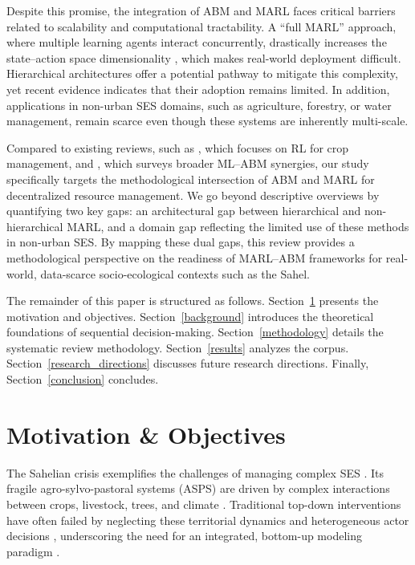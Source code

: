 \documentclass[conference]{IEEEtran}
\begin{document}
Despite this promise, the integration of ABM and MARL faces critical barriers related to scalability and computational tractability. A “full MARL” approach, where multiple learning agents interact concurrently, drastically increases the state–action space dimensionality \cite{zhangMultiAgentReinforcementLearning2021}, which makes real-world deployment difficult. Hierarchical architectures offer a potential pathway to mitigate this complexity, yet recent evidence indicates that their adoption remains limited. In addition, applications in non-urban SES domains, such as agriculture, forestry, or water management, remain scarce even though these systems are inherently multi-scale. 

Compared to existing reviews, such as \cite{gautronReinforcementLearningCrop2022}, which focuses on RL for crop management, and \cite{Zhang20232170}, which surveys broader ML–ABM synergies, our study specifically targets the methodological intersection of ABM and MARL for decentralized resource management. We go beyond descriptive overviews by quantifying two key gaps: an architectural gap between hierarchical and non-hierarchical MARL, and a domain gap reflecting the limited use of these methods in non-urban SES. By mapping these dual gaps, this review provides a methodological perspective on the readiness of MARL–ABM frameworks for real-world, data-scarce socio-ecological contexts such as the Sahel.

The remainder of this paper is structured as follows. Section~\ref{motivation} presents the motivation and objectives. Section~\ref{background} introduces the theoretical foundations of sequential decision-making. Section~\ref{methodology} details the systematic review methodology. Section~\ref{results} analyzes the corpus. Section~\ref{research_directions} discusses future research directions. Finally, Section~\ref{conclusion} concludes.

\section{Motivation \& Objectives}
\label{motivation}

The Sahelian crisis exemplifies the challenges of managing complex SES \cite{vermeulenClimateChangeFood2012}. Its fragile agro-sylvo-pastoral systems (ASPS) are driven by complex interactions between crops, livestock, trees, and climate \cite{traoreAgentBasedModelTranshumant2024}. Traditional top-down interventions have often failed by neglecting these territorial dynamics and heterogeneous actor decisions \cite{turnerEnvironmentalRehabilitationVulnerability2021, mirzabaevEconomicEfficiencyTargeting2022}, underscoring the need for an integrated, bottom-up modeling paradigm \cite{gaudouMAELIAMultiagentPlatform2013}.
\end{document}
